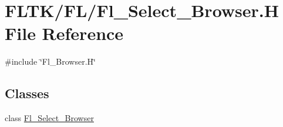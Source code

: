 \hypertarget{_fl___select___browser_8_h}{}\section{F\+L\+T\+K/\+F\+L/\+Fl\+\_\+\+Select\+\_\+\+Browser.H File Reference}
\label{_fl___select___browser_8_h}
{\ttfamily \#include \char`\"{}Fl\+\_\+\+Browser.\+H\char`\"{}}\newline
\subsection*{Classes}
\begin{DoxyCompactItemize}
\item 
class \hyperlink{class_fl___select___browser}{Fl\+\_\+\+Select\+\_\+\+Browser}
\end{DoxyCompactItemize}
